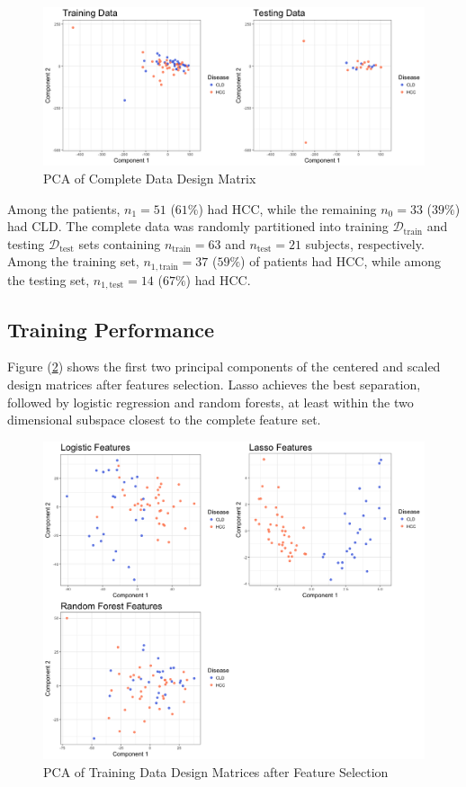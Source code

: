 \documentclass[a4paper]{article}
\begin{document}
\begin{figure}[h!]
\centering
\includegraphics[scale=0.40]{Fig01.png}
\caption{PCA of Complete Data Design Matrix}
\label{fig:01}
\end{figure}

Among the patients,  $n_{1} = 51$ ($61\%$) had HCC, while the remaining $n_{0} = 33$ ($39\%$) had CLD. The complete data was randomly partitioned into training $\mathcal{D}_{\text{train}}$ and testing $\mathcal{D}_{\text{test}}$ sets containing $n_{\text{train}} = 63$ and $n_{\text{test}} = 21$ subjects, respectively. Among the training set, $n_{1,\text{train}} = 37$ ($59\%$) of patients had HCC, while among the testing set, $n_{1,\text{test}} = 14$ ($67\%$) had HCC. 

\subsection{Training Performance}
Figure (\ref{fig:02}) shows the first two principal components of the centered and scaled design matrices after features selection. Lasso achieves the best separation, followed by logistic regression and random forests, at least within the two dimensional subspace closest to the complete feature set.

\begin{figure}[h!]
\centering
\includegraphics[scale=0.40]{Fig02.png}
\caption{PCA of Training Data Design Matrices after Feature Selection}
\label{fig:02}
\end{figure}
\end{document}
